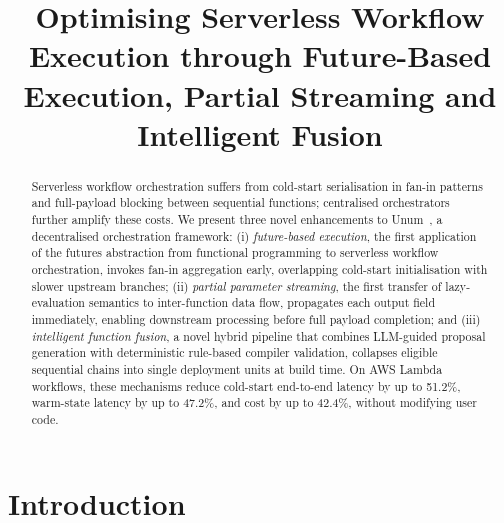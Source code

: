 \documentclass[runningheads]{llncs}
\begin{document}
%
\title{Optimising Serverless Workflow Execution through Future-Based Execution, Partial Streaming and Intelligent Fusion}

%
%
%
%
\maketitle              %
%
\begin{abstract}
Serverless workflow orchestration suffers from cold-start serialisation in fan-in patterns and full-payload blocking between sequential functions; centralised orchestrators further amplify these costs. We present three novel enhancements to Unum~\cite{285171}, a decentralised orchestration framework: (i) \emph{future-based execution}, the first application of the futures abstraction from functional programming to serverless workflow orchestration, invokes fan-in aggregation early, overlapping cold-start initialisation with slower upstream branches; (ii) \emph{partial parameter streaming}, the first transfer of lazy-evaluation semantics to inter-function data flow, propagates each output field immediately, enabling downstream processing before full payload completion; and (iii) \emph{intelligent function fusion}, a novel hybrid pipeline that combines LLM-guided proposal generation with deterministic rule-based compiler validation, collapses eligible sequential chains into single deployment units at build time. On AWS Lambda workflows, these mechanisms reduce cold-start end-to-end latency by up to 51.2\%, warm-state latency by up to 47.2\%, and cost by up to 42.4\%, without modifying user code.


\end{abstract}

\section{Introduction}
\label{sec:introduction}
\end{document}
